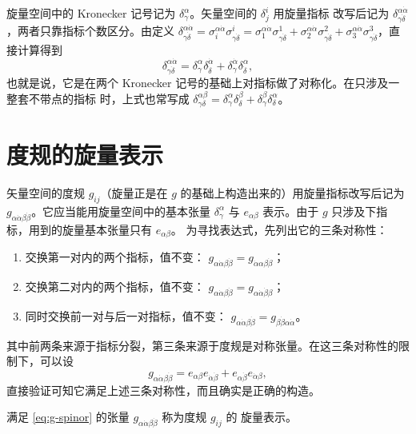 旋量空间中的 Kronecker 记号记为 $\delta^\alpha_\gamma$。矢量空间的 $\delta^i_j$ 用旋量指标
改写后记为 $\delta^{\alpha\dot\alpha}_{\gamma\dot\delta}$，两者只靠指标个数区分。由定义
$\delta^{\alpha\dot\alpha}_{\gamma\dot\delta}
=\sigma_i^{\alpha\dot\alpha}\sigma^i_{\gamma\dot\delta}
=\sigma_1^{\alpha\dot\alpha}\sigma^1_{\gamma\dot\delta}
+\sigma_2^{\alpha\dot\alpha}\sigma^2_{\gamma\dot\delta}
+\sigma_3^{\alpha\dot\alpha}\sigma^3_{\gamma\dot\delta}$，直接计算得到
\[
\delta^{\alpha\dot\alpha}_{\gamma\dot\delta}
=\delta^\alpha_\gamma\delta^{\dot\alpha}_{\dot\delta}
+\delta^{\dot\alpha}_\gamma\delta^\alpha_{\dot\delta},
\]
也就是说，它是在两个 Kronecker 记号的基础上对指标做了对称化。在只涉及一整套不带点的指标
时，上式也常写成 $\delta^{\alpha\beta}_{\gamma\delta}
=\delta^\alpha_\gamma\delta^\beta_\delta+\delta^\beta_\gamma\delta^\alpha_\delta$。

\section{度规的旋量表示}

矢量空间的度规 $g_{ij}$（旋量正是在 $g$ 的基础上构造出来的）用旋量指标改写后记为
$g_{\alpha\dot\alpha\beta\dot\beta}$。它应当能用旋量空间中的基本张量 $\delta^\alpha_\gamma$
与 $e_{\alpha\beta}$ 表示。由于 $g$ 只涉及下指标，用到的旋量基本张量只有 $e_{\alpha\beta}$。
为寻找表达式，先列出它的三条对称性：

\begin{enumerate}[label=(\arabic*),leftmargin=2.4em]
\item 交换第一对内的两个指标，值不变：
      $g_{\alpha\dot\alpha\beta\dot\beta}=g_{\dot\alpha\alpha\beta\dot\beta}$；
\item 交换第二对内的两个指标，值不变：
      $g_{\alpha\dot\alpha\beta\dot\beta}=g_{\alpha\dot\alpha\dot\beta\beta}$；
\item 同时交换前一对与后一对指标，值不变：
      $g_{\alpha\dot\alpha\beta\dot\beta}=g_{\beta\dot\beta\alpha\dot\alpha}$。
\end{enumerate}

其中前两条来源于指标分裂，第三条来源于度规是对称张量。在这三条对称性的限制下，可以设
\begin{equation}\label{eq:g-spinor}
g_{\alpha\dot\alpha\beta\dot\beta}
=e_{\alpha\beta}e_{\dot\alpha\dot\beta}+e_{\alpha\dot\beta}e_{\dot\alpha\beta},
\end{equation}
直接验证可知它满足上述三条对称性，而且确实是正确的构造。

\begin{definition}[旋量形式下的度规]
满足 \eqref{eq:g-spinor} 的张量 $g_{\alpha\dot\alpha\beta\dot\beta}$ 称为度规 $g_{ij}$ 的
旋量表示。
\end{definition}

